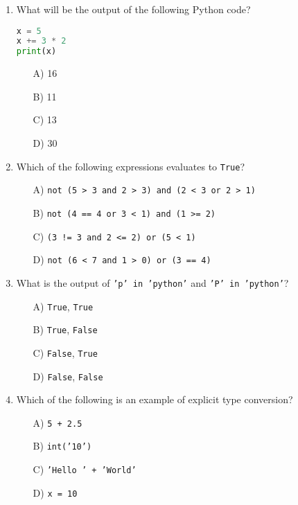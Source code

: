 \documentclass[9pt]{article}
\begin{document}
\begin{multicols}{2}
\begin{enumerate}
\item What will be the output of the following Python code?
\begin{lstlisting}[language=Python]
x = 5
x += 3 * 2
print(x)
\end{lstlisting}
\begin{enumerate}
\item[A)] 16
\item[B)] 11
\item[C)] 13
\item[D)] 30
\end{enumerate}


\item Which of the following expressions evaluates to \texttt{True}?
\begin{enumerate}
    \item[A)] \texttt{not (5 > 3 and 2 > 3) and (2 < 3 or 2 > 1)}
    \item[B)] \texttt{not (4 == 4 or 3 < 1) and (1 >= 2)}
    \item[C)] \texttt{(3 != 3 and 2 <= 2) or (5 < 1)}
    \item[D)] \texttt{not (6 < 7 and 1 > 0) or (3 == 4)}
\end{enumerate}


\item What is the output of \texttt{'p' in 'python'} and \texttt{'P' in 'python'}?
\begin{enumerate}
    \item[A)] \texttt{True}, \texttt{True}
    \item[B)] \texttt{True}, \texttt{False}
    \item[C)] \texttt{False}, \texttt{True}
    \item[D)] \texttt{False}, \texttt{False}
\end{enumerate}

\item Which of the following is an example of explicit type conversion?
\begin{enumerate}
    \item[A)] \texttt{5 + 2.5}
    \item[B)] \texttt{int('10')}
    \item[C)] \texttt{'Hello ' + 'World'}
    \item[D)] \texttt{x = 10}
\end{enumerate}


\end{enumerate}
\end{multicols}
\end{document}
